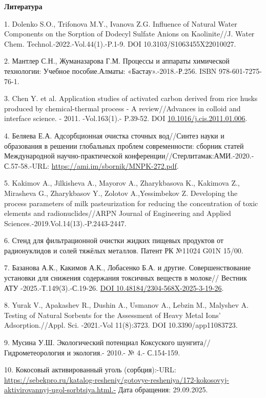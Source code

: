 \begin{center}
{\bfseries Литература}
\end{center}

\begin{refs}
1. Dolenko S.O., Trifonova M.Y., Ivanova Z.G. Influence of Natural Water
Components on the Sorption of Dodecyl Sulfate Anions on Kaolinite//J.
Water Chem. Technol.-2022.-Vol.44(1).-P.1-9. DOI
10.3103/S1063455X22010027.

2. Мантлер С.Н., Жуманазарова Г.М. Процессы и аппараты химической
технологии: Учебное пособие.Алматы: «Бастау».-2018.-Р.256. ISBN
978-601-7275-76-1.

3. Chen Y. et al. Application studies of activated carbon derived from
rice husks produced by chemical-thermal process - A review//Advances
in colloid and interface science. - 2011. -Vol.163(1).- P.39-52. DOI
\href{https://doi.org/10.1016/j.cis.2011.01.006}{10.1016/j.cis.2011.01.006}.

4. Беляева Е.А. Адсорбционная очистка сточных вод//Синтез науки и
образования в решении глобальных проблем современности: сборник статей
Международной научно-практической
конференции//Стерлитамак:АМИ.-2020.-С.57-58.-URL:
\url{https://ami.im/sbornik/MNPK-272.pdf}.

5. Kakimov A., Jilkisheva A., Mayorov A., Zharykbasova K., Kakimova Z.,
Mirasheva G., Zharykbasov Y., Zolotov A.,Yessimbekov Z. Developing the
process parameters of milk pasteurization for reducing the
concentration of toxic elements and radionuclides//ARPN Journal of
Engineering and Applied Sciences.-2019.Vol.14(13).-P.2443-2447.

6. Стенд для фильтрационной очистки жидких пищевых продуктов от
радионуклидов и солей тяжёлых металлов. Патент РК №11024 G01N 15/00.

7. Базанова А.К., Какимов А.К., Лобасенко Б.А. и другие.
Совершенствование установки для снижения содержания токсичных веществ
в молоке// Вестник АТУ -2025.-Т.149(3).-С.19-26.
\href{https://doi.org/10.48184/2304-568X-2025-3-19-26}{DOI
10.48184/2304-568X-2025-3-19-26}.

8. Yurak V., Apakashev R., Dushin A., Usmanov A., Lebzin M., Malyshev A.
Testing of Natural Sorbents for the Assessment of Heavy Metal Ions'
Adsorption.//Appl. Sci. -2021.-Vol 11(8):3723. DOI
10.3390/app11083723.

9. Мусина У.Ш. Экологический потенциал Коксуского
шунгита//Гидрометеорология и экология.- 2010.- № 4.- С.154-159.

10. Кокосовый активированный уголь (сорбция):-URL:
\url{https://sebekpro.ru/katalog-resheniy/gotovye-resheniya/172-kokosovyj-aktivirovannyj-ugol-sorbtsiya.html.-}
Дата обращения: 29.09.2025.
\end{refs}


